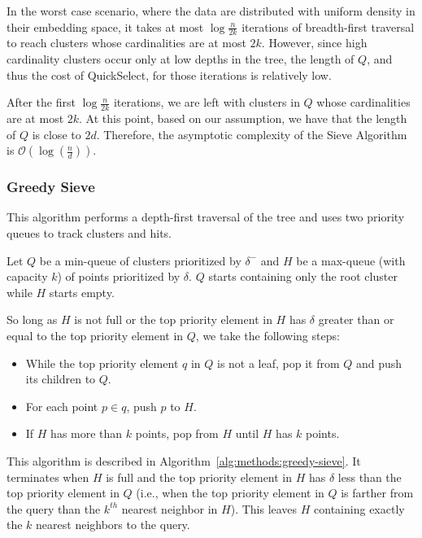In the worst case scenario, where the data are distributed with uniform density in their embedding space, it takes at most $\log{\frac{n}{2k}}$ iterations of breadth-first traversal to reach clusters whose cardinalities are at most $2k$.
However, since high cardinality clusters occur only at low depths in the tree, the length of $Q$, and thus the cost of QuickSelect, for those iterations is relatively low.

After the first $\log{\frac{n}{2k}}$ iterations, we are left with clusters in $Q$ whose cardinalities are at most $2k$.
At this point, based on our assumption, we have that the length of $Q$ is close to $2d$.
Therefore, the asymptotic complexity of the Sieve Algorithm is $\mathcal{O} \left( \log(\frac{n}{d}) \right)$.


\subsubsection{Greedy Sieve}
\label{subsubsec:methods:knn:greedy-sieve}

This algorithm performs a depth-first traversal of the tree and uses two priority queues to track clusters and hits.

Let $Q$ be a min-queue of clusters prioritized by $\delta^{-}$ and $H$ be a max-queue (with capacity $k$) of points prioritized by $\delta$.
$Q$ starts containing only the root cluster while $H$ starts empty.

So long as $H$ is not full or the top priority element in $H$ has $\delta$ greater than or equal to the top priority element in $Q$, we take the following steps:

\begin{itemize}
    \item While the top priority element $q$ in $Q$ is not a leaf, pop it from $Q$ and push its children to $Q$.
    \item For each point $p \in q$, push $p$ to $H$.
    \item If $H$ has more than $k$ points, pop from $H$ until $H$ has $k$ points.
\end{itemize}

This algorithm is described in Algorithm~\ref{alg:methods:greedy-sieve}.
It terminates when $H$ is full and the top priority element in $H$ has $\delta$ less than the top priority element in $Q$ (i.e., when the top priority element in $Q$ is farther from the query than the $k^{th}$ nearest neighbor in $H$).
This leaves $H$ containing exactly the $k$ nearest neighbors to the query.


